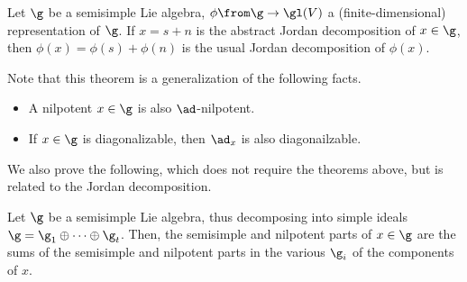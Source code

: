 \documentclass[11pt,leqno,oneside]{amsart}
\numberwithin{thm}{section}
\begin{document}
\begin{cor}
  Let \(\g\) be a semisimple Lie algebra, \(\phi \from \g \to \gl(V)\)
  a (finite-dimensional) representation of \(\g\). If \(x = s+n\) is
  the abstract Jordan decomposition of \(x \in \g\), then \(\phi(x) =
  \phi(s) + \phi(n)\) is the usual Jordan decomposition of \(\phi(x)\).
\end{cor}
\begin{rmk}
  Note that this theorem is a generalization of the following facts.
  \begin{itemize}
  \item A nilpotent \(x \in \g\) is also \(\ad\)-nilpotent.
  \item If \(x \in \g\) is diagonalizable, then \(\ad_x\) is also
    diagonailzable. 
  \end{itemize}
\end{rmk}
We also prove the following, which does not require the theorems
above, but is related to the Jordan decomposition.
\begin{prop}\label{ss-and-nilp-respect-decomp-into-simple-ideals}
  Let \(\g\) be a semisimple Lie algebra, thus decomposing into simple
  ideals \(\g = \g_1 \oplus \cdots \oplus \g_t\). Then, the semisimple
  and nilpotent parts of \(x \in \g\) are the sums of the semisimple
  and nilpotent parts in the various \(\g_i\) of the components of \(x\).
\end{prop}
\end{document}
